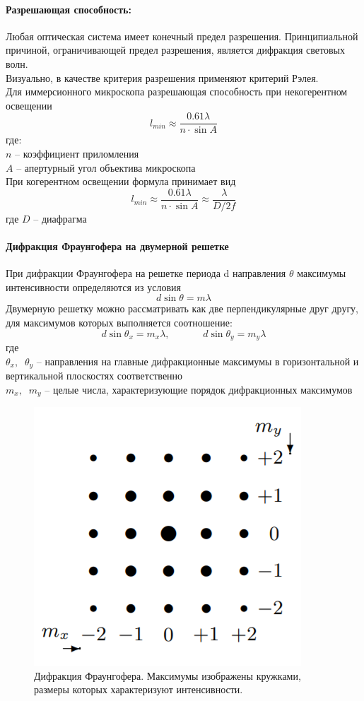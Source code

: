 \documentclass[a4paper,12pt]{article}
\begin{document}
\paragraph{Разрешающая способность:}
Любая оптическая система имеет конечный предел разрешения. Принципиальной причиной, ограничивающей предел разрешения, является дифракция световых волн. \\
Визуально, в качестве критерия разрешения применяют критерий Рэлея.\\
Для иммерсионного микроскопа разрешающая способность при некогерентном освещении 
\begin{equation}
l_{min} \approx \frac{0.61\lambda}{n\cdot \sin A}
\end{equation}
где:\\  
$n$ -- коэффициент приломления\\
$A$ -- апертурный угол объектива микроскопа\\
При когерентном освещении формула принимает вид \begin{equation}
l_{min} \approx \frac{0.61\lambda}{n\cdot \sin A} \approx \frac{\lambda}{D/2f}
\end{equation}
где $D$ -- диафрагма
\paragraph{Дифракция Фраунгофера на двумерной решетке}
При дифракции Фраунгофера на решетке периода d направления $\theta$ максимумы интенсивности определяются из условия
\[d\sin\theta = m\lambda\] 
Двумерную решетку можно рассматривать как две перпендикулярные друг другу, для максимумов которых выполняется соотношение:
\begin{equation}
d\sin \theta_{x} = m_{x}\lambda, \;\;\;\;\;\;\;\;\;\;\;\; d\sin\theta_{y} = m_{y}\lambda
\end{equation}
где \\
$\theta_{x}, \;\; \theta_{y}$ -- направления на главные дифракционные
максимумы в горизонтальной и вертикальной плоскостях соответственно\\
$m_{x}, \;\; m_{y}$ -- целые числа, характеризующие порядок дифракционных максимумов
\begin{figure}[h!]
\centering
\includegraphics[scale=0.5]{FG.png} 
\caption{Дифракция Фраунгофера. Максимумы изображены кружками, размеры которых характеризуют интенсивности.}
\end{figure}
\end{document}

